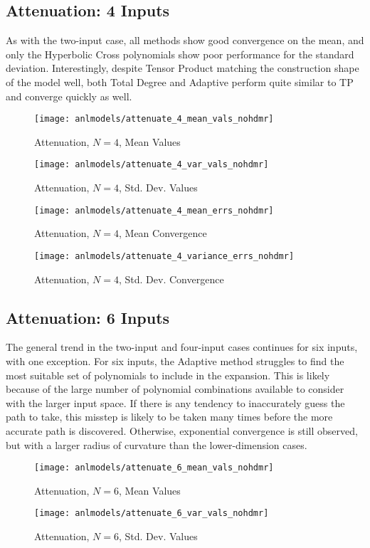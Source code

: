 \subsection{Attenuation: 4 Inputs}
As with the two-input case, all methods show good convergence on the mean, and only the Hyperbolic Cross
polynomials show poor performance for the standard deviation.  Interestingly, despite Tensor Product matching
the construction shape of the model well, both Total Degree and Adaptive perform quite similar to TP and converge
quickly as well.
\begin{figure}[H]
  \centering
  \texttt{[image: anlmodels/attenuate\_4\_mean\_vals\_nohdmr]}
  \caption{Attenuation, $N=4$, Mean Values}
  \label{fig:attenuate mean values 4}
\end{figure}
\begin{figure}[H]
  \centering
  \texttt{[image: anlmodels/attenuate\_4\_var\_vals\_nohdmr]}
  \caption{Attenuation, $N=4$, Std. Dev. Values}
  \label{fig:attenuate var values 4}
\end{figure}

\begin{figure}[H]
  \centering
  \texttt{[image: anlmodels/attenuate\_4\_mean\_errs\_nohdmr]}
  \caption{Attenuation, $N=4$, Mean Convergence}
  \label{fig:attenuate mean errors 4}
\end{figure}
\begin{figure}[H]
  \centering
  \texttt{[image: anlmodels/attenuate\_4\_variance\_errs\_nohdmr]}
  \caption{Attenuation, $N=4$, Std. Dev. Convergence}
  \label{fig:attenuate var errors 4}
\end{figure}

\subsection{Attenuation: 6 Inputs}
The general trend in the two-input and four-input cases continues for six inputs, with one exception.  For six
inputs, the Adaptive method struggles to find the most suitable set of polynomials to include in the
expansion.  This is likely because of the large number of polynomial combinations available to consider 
with the larger input space.  If there is any tendency to inaccurately guess the path to take, this misstep is
likely to be taken many times before the more accurate path is discovered.  Otherwise, exponential convergence
is still observed, but with a larger radius of curvature than the lower-dimension cases.
\begin{figure}[H]
  \centering
  \texttt{[image: anlmodels/attenuate\_6\_mean\_vals\_nohdmr]}
  \caption{Attenuation, $N=6$, Mean Values}
  \label{fig:attenuate mean values 6}
\end{figure}
\begin{figure}[H]
  \centering
  \texttt{[image: anlmodels/attenuate\_6\_var\_vals\_nohdmr]}
  \caption{Attenuation, $N=6$, Std. Dev. Values}
  \label{fig:attenuate var values 6}
\end{figure}

